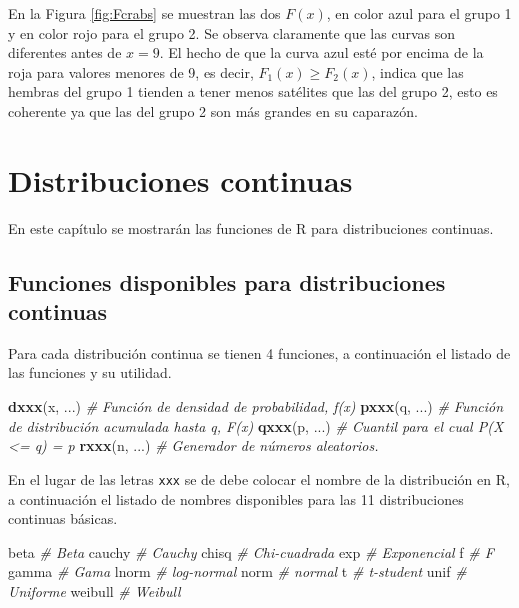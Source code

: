 \documentclass[10pt,]{krantz}
\makeatletter
\newenvironment{Shaded}{\begin{snugshade}}{\end{snugshade}}
\newcommand{\KeywordTok}[1]{\textcolor[rgb]{0.13,0.29,0.53}{\textbf{{#1}}}}
\newcommand{\CommentTok}[1]{\textcolor[rgb]{0.56,0.35,0.01}{\textit{{#1}}}}
\newcommand{\NormalTok}[1]{{#1}}
\let\proglang=\textsf
\newenvironment{kframe}{%
\medskip{}
\setlength{\fboxsep}{.8em}
 \def\at@end@of@kframe{}%
 \ifinner\ifhmode%
  \def\at@end@of@kframe{\end{minipage}}%
  \begin{minipage}{\columnwidth}%
 \fi\fi%
 \def\FrameCommand##1{\hskip\@totalleftmargin \hskip-\fboxsep
 \colorbox{shadecolor}{##1}\hskip-\fboxsep
     \hskip-\linewidth \hskip-\@totalleftmargin \hskip\columnwidth}%
 \MakeFramed {\advance\hsize-\width
   \@totalleftmargin\z@ \linewidth\hsize
   \@setminipage}}%
 {\par\unskip\endMakeFramed%
 \at@end@of@kframe}
\renewenvironment{Shaded}{\begin{kframe}}{\end{kframe}}
\makeatother
\begin{document}
En la Figura \ref{fig:Fcrabs} se muestran las dos \(F(x)\), en color
azul para el grupo 1 y en color rojo para el grupo 2. Se observa
claramente que las curvas son diferentes antes de \(x=9\). El hecho de
que la curva azul esté por encima de la roja para valores menores de 9,
es decir, \(F_1(x) \geq F_2(x)\), indica que las hembras del grupo 1
tienden a tener menos satélites que las del grupo 2, esto es coherente
ya que las del grupo 2 son más grandes en su caparazón.

\chapter{Distribuciones continuas}\label{distribuciones-continuas}

En este capítulo se mostrarán las funciones de \proglang{R} para
distribuciones continuas.

\section{Funciones disponibles para distribuciones
continuas}\label{funciones-disponibles-para-distribuciones-continuas}

Para cada distribución continua se tienen 4 funciones, a continuación el
listado de las funciones y su utilidad.

\begin{Shaded}
\begin{Highlighting}[]
\KeywordTok{dxxx}\NormalTok{(x, ...)  }\CommentTok{# Función de densidad de probabilidad, f(x)}
\KeywordTok{pxxx}\NormalTok{(q, ...)  }\CommentTok{# Función de distribución acumulada hasta q, F(x)}
\KeywordTok{qxxx}\NormalTok{(p, ...)  }\CommentTok{# Cuantil para el cual P(X <= q) = p}
\KeywordTok{rxxx}\NormalTok{(n, ...)  }\CommentTok{# Generador de números aleatorios.}
\end{Highlighting}
\end{Shaded}

En el lugar de las letras \texttt{xxx} se de debe colocar el nombre de
la distribución en \proglang{R}, a continuación el listado de nombres
disponibles para las 11 distribuciones continuas básicas.

\begin{Shaded}
\begin{Highlighting}[]
\NormalTok{beta     }\CommentTok{# Beta}
\NormalTok{cauchy   }\CommentTok{# Cauchy}
\NormalTok{chisq    }\CommentTok{# Chi-cuadrada}
\NormalTok{exp      }\CommentTok{# Exponencial}
\NormalTok{f        }\CommentTok{# F}
\NormalTok{gamma    }\CommentTok{# Gama}
\NormalTok{lnorm    }\CommentTok{# log-normal}
\NormalTok{norm     }\CommentTok{# normal}
\NormalTok{t        }\CommentTok{# t-student}
\NormalTok{unif     }\CommentTok{# Uniforme}
\NormalTok{weibull  }\CommentTok{# Weibull}
\end{Highlighting}
\end{Shaded}
\end{document}
